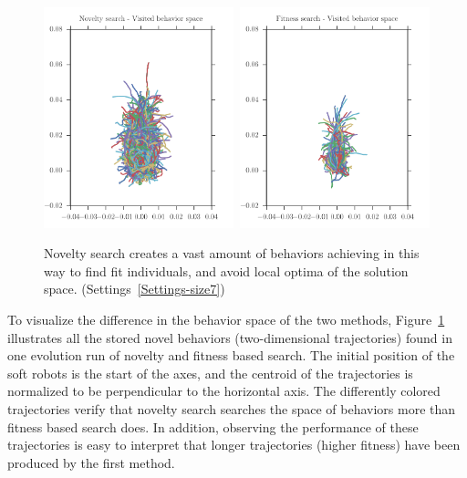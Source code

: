 \begin{figure}[t!]
\centering
\includegraphics[width=0.49\textwidth]{../Figures/Behaviors/behaviorsNovelty.pdf}\	
\includegraphics[width=0.49\textwidth]{../Figures/Behaviors/behaviorsFitness.pdf}
\caption{Novelty search creates a vast amount of behaviors achieving in this way to find fit individuals, and avoid local optima of the solution space. (Settings~\ref{Settings-size7})}
\label{fig:behaviorSpaceDiversity}
\end{figure}
To visualize the difference in the behavior space of the two methods, Figure~\ref{fig:behaviorSpaceDiversity} illustrates all the stored novel behaviors (two-dimensional trajectories) found in one evolution run of novelty and fitness based search. The initial position of the soft robots is the start of the axes, and the centroid of the trajectories is normalized to be perpendicular to the horizontal axis. The differently colored trajectories verify that novelty search searches the space of behaviors more than fitness based search does. In addition, observing the performance of these trajectories is easy to interpret that longer trajectories (higher fitness) have been produced by the first method. 

